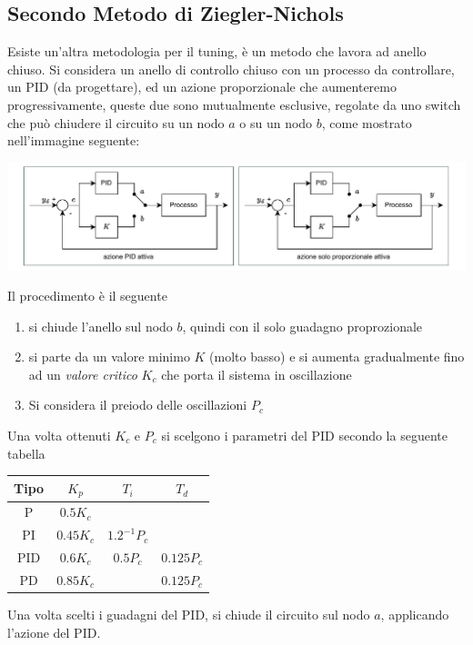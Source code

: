 \documentclass[10pt, letterpaper]{report}
\begin{document}
\subsection{Secondo Metodo di Ziegler-Nichols}
Esiste un'altra metodologia per il tuning, è un metodo che lavora ad anello chiuso. Si considera un anello di controllo chiuso con un processo da controllare, un PID (da progettare), ed un azione proporzionale che aumenteremo progressivamente, queste due sono mutualmente esclusive, regolate da uno switch che può chiudere il circuito su un nodo $a$ o su un nodo $b$, come mostrato nell'immagine seguente:
\begin{center}
    \includegraphics[width=1\textwidth]{images/2Metodo2N.pdf}
\end{center}
Il procedimento è il seguente \begin{enumerate}
    \item si chiude l'anello sul nodo $b$, quindi con il solo guadagno proprozionale 
    \item si parte da un valore minimo $K$ (molto basso) e si aumenta gradualmente fino ad un \textit{valore critico}  $K_c$ che porta il sistema in oscillazione
    \item Si considera il preiodo delle oscillazioni $P_c$
\end{enumerate}
Una volta ottenuti $K_c$ e $P_c$ si scelgono i parametri del PID secondo la seguente tabella 
\begin{center}
    \begin{tabular}{|c|c|c|c|}
        \hline
        Tipo & $K_p$     & $T_i$         & $T_d$      \\ \hline
        P    & $0.5K_c$  &               &            \\ \hline
        PI   & $0.45K_c$ & $1.2^{-1}P_c$ &            \\ \hline
        PID  & $0.6K_c$  & $0.5P_c$      & $0.125P_c$ \\ \hline
        PD   & $0.85K_c$ &               & $0.125P_c$ \\ \hline
    \end{tabular}
\end{center}
Una volta scelti i guadagni del PID, si chiude il circuito sul nodo $a$, applicando l'azione del PID.
\end{document}
